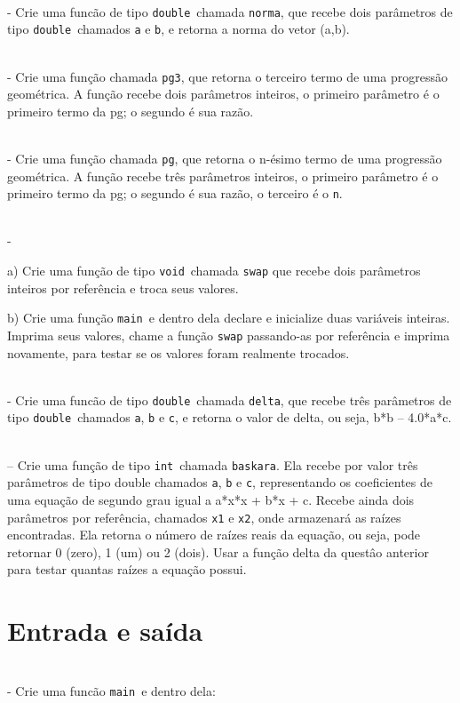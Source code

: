 \documentclass{book}
\newcommand{\NEWLINE}{~\\}
\newcommand{\VOID}{{\tt void}}
\newcommand{\INT}{{\tt int}}
\newcommand{\DOUBLE}{{\tt double}}
\newcommand{\MAIN}{{\tt main}}
\begin{document}
\NEWLINE
\quest - Crie uma funcão de tipo \DOUBLE\ chamada {\tt norma}, que recebe dois parâmetros de tipo \DOUBLE\ chamados {\tt a} e {\tt b}, e retorna a norma do vetor (a,b).


\NEWLINE
\quest - Crie uma função chamada {\tt pg3}, que retorna o terceiro termo de uma progressão geométrica. A função recebe dois parâmetros inteiros, o primeiro parâmetro é o primeiro termo da pg; o segundo é sua razão.

\NEWLINE
\quest - Crie uma função chamada {\tt pg}, que retorna o n-ésimo termo de uma progressão geométrica. A função recebe três parâmetros inteiros, o primeiro parâmetro é o primeiro termo da pg; o segundo é sua razão, o terceiro é o {\tt n}.

\NEWLINE
\quest -

a) Crie uma função de tipo \VOID\ chamada {\tt swap} que recebe dois parâmetros inteiros por referência e troca seus valores.

b) Crie uma função  \MAIN\ e dentro dela declare e inicialize duas variáveis inteiras. Imprima seus valores, chame a função {\tt swap} passando-as por referência e imprima novamente, para testar se os valores foram realmente trocados.

\NEWLINE
\quest - Crie uma funcão de tipo \DOUBLE\ chamada {\tt delta}, que recebe três parâmetros de tipo \DOUBLE\ chamados {\tt a}, {\tt b} e {\tt c}, e retorna o valor de delta, ou seja, b*b – 4.0*a*c.

\NEWLINE
\quest – Crie uma função de tipo \INT\ chamada {\tt baskara}. Ela recebe por valor três parâmetros de tipo double chamados {\tt a}, {\tt b} e {\tt c}, representando os coeficientes de uma equação de segundo grau igual a a*x*x + b*x + c. Recebe ainda dois parâmetros por referência, chamados {\tt x1} e {\tt x2}, onde armazenará as raízes encontradas. Ela retorna o número de raízes reais da equação, ou seja, pode retornar 0 (zero), 1 (um) ou 2 (dois). Usar a função  delta da questâo anterior para testar quantas raízes a equação possui.




\zeraquest

\section{Entrada e saída}


\NEWLINE
\quest - Crie uma funcão \MAIN\ e dentro dela:
\end{document}
